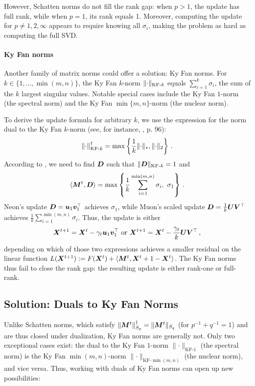 \documentclass[pmlr]{jmlr}%
\newcommand{\norm}[1]{\lVert #1\rVert}
\DeclarePairedDelimiter{\norms}{\|}{\|_{\mathrm{2}}}
\DeclarePairedDelimiter{\normn}{\|}{\|_{*}}
\DeclarePairedDelimiter{\normkfk}{\|}{\|_{\text{KF-}k}}
\def\<#1,#2>{\langle #1,#2\rangle}
\begin{document}
 However, Schatten norms do not fill the rank gap: when $p > 1$, the update has full rank, while when $p=1$, its rank equals 1. Moreover, computing the update for $p \neq 1, 2, \infty$ appears to require knowing all $\sigma_i$, making the problem as hard as computing the full SVD.
 
 \paragraph{Ky Fan norms}
 Another family of matrix norms could offer a solution: Ky Fan norms. For $k \in \{1, \dots, \min(m, n)\}$, the Ky Fan $k$-norm $\normkfk{\cdot}$ equals $\sum_{i=1}^{k}\sigma_i$, the sum of the $k$ largest singular values. Notable special cases include the Ky Fan $1$-norm (the spectral norm) and the Ky Fan $\min\{m, n\}$-norm (the nuclear norm).
 
 To derive the update formula for arbitrary $k$, we use the expression for the norm dual to the Ky Fan $k$-norm (see, for instance, \citep{bhatia2013matrix}, p. 96):
 \[
     \normkfk{\cdot}^\dagger = \max\left\{\frac{1}{k} \normn{\cdot}, \norms{\cdot}\right\}\,.
 \]
 According to , we need to find ${\bm{D}}$ such that $\normkfk{\mD} = 1$ and
 \[
 \<\mM^t, \mD> = \max\left\{\frac{1}{k}\sum_{i=1}^{\min(m,n)}\sigma_i,\ \sigma_1\right\}\,.
 \]
 Neon's update ${\bm{D}} = {\bm{u}}_1 {\bm{v}}_1^\top$ achieves $\sigma_1$, while Muon's scaled update ${\bm{D}} = \frac{1}{k}{\bm{U}}{\bm{V}}^\top$ achieves $\frac{1}{k}\sum_{i=1}^{\min(m,n)}\sigma_i$. Thus, the update is either
 \[
 {\bm{X}}^{t+1} = {\bm{X}}^{t} - \gamma_t {\bm{u}}_1 {\bm{v}}_1^\top\text{ or }{\bm{X}}^{t+1} = {\bm{X}}^{t} - \frac{\gamma_t}{k}{\bm{U}} {\bm{V}}^\top\,,
 \]
 depending on which of those two expressions achieves a smaller residual on the linear function $L(\mX^{t+1}) := F(\mX^t) + \<\mM^t, \mX^{t+1} - \mX^t>$. The Ky Fan norms thus fail to close the rank gap: the resulting update is either rank-one or full-rank.
 
 \subsection{Solution: Duals to Ky Fan Norms}
 
 Unlike Schatten norms, which satisfy $\norm{\mM^t}_{S_p}^\dagger = \norm{\mM^t}_{S_q}$ (for $p^{-1} + q^{-1} = 1$) and are thus closed under dualization, Ky Fan norms are generally not. Only two exceptional cases exist: the dual to the Ky Fan $1$-norm $\norm{\cdot}_{\text{KF-}1}$ (the spectral norm) is the Ky Fan $\min(m,n)$-norm $\norm{\cdot}_{\text{KF-}\min(m,n)}$ (the nuclear norm), and vice versa. Thus, working with duals of Ky Fan norms can open up new possibilities:
 
\end{document}
